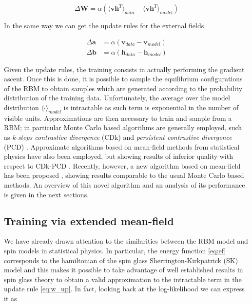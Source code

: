 \documentclass{revtex4-1}
\begin{document}
\begin{equation}
\Delta \mathbf{W} = \alpha \left( \langle \mathbf{v h}^T \rangle_{data} - \langle \mathbf{v h}^T \rangle_{model} \right)
\label{eq:w_up}
\end{equation}

In the same way we can get the update rules for the external fields

\begin{align}
\Delta \mathbf{a} &= \alpha \left( \mathbf{v}_{data} - \mathbf{v}_{model} \right) \\
\Delta \mathbf{b} &= \alpha \left( \mathbf{h}_{data} - \mathbf{h}_{model} \right)
\end{align}

Given the update rules, the training consists in actually performing the gradient ascent. Once this is done, it is possible to sample the equilibrium configurations of the RBM to obtain samples which are generated according to the probability distribution of the training data. Unfortunately, the average over the model distribution \(\textstyle \langle \cdot \rangle_{model}\) is intractable as such term is exponential in the number of visible units. Approximations are then necessary to train and sample from a RBM; in particular Monte Carlo based algorithms are generally employed, such as \textit{k-steps contrastive divergence} (CDk) \cite{Hinton_CD}  and \textit{persistent contrastive divergence} (PCD) \cite{PCD}. Approximate algorithms based on mean-field methods from statistical physics have also been employed, but showing results of inferior quality with respect to CDk-PCD \cite{PCD}. Recently, however, a new algorithm based on mean-field has been proposed \cite{tap_train}, showing results comparable to the usual Monte Carlo based methods. An overview of this novel algorithm and an analysis of its performance is given in the next sections.

\subsection{Training via extended mean-field} \label{sec:emf}
We have already drawn attention to the similarities between the RBM model and spin models in statistical physics. In particular, the energy function \eqref{eq:ef} corresponds to the hamiltonian of the spin glass Sherrington-Kirkpatrick (SK) model \cite{SK} and this makes it possible to take advantage of well established results in spin glass theory to obtain a valid approximation to the intractable term in the update rule \eqref{eq:w_up}. In fact, looking back at the log-likelihood we can express it as
\end{document}
